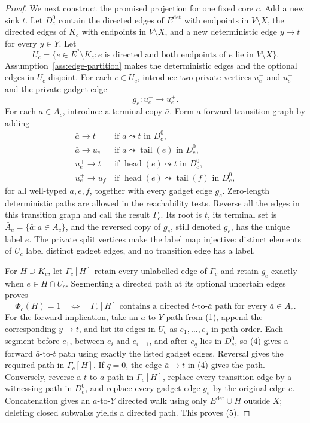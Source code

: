 \documentclass{article}
\begin{document}
\begin{proof}
We next construct the promised projection for one fixed core \(c\).  Add a new sink \(t\).  Let \(D_c^0\) contain the directed edges of \(E^{\mathrm{det}}\) with endpoints in \(V\setminus X\), the directed edges of \(K_c\) with endpoints in \(V\setminus X\), and a new deterministic edge \(y\to t\) for every \(y\in Y\).  Let
\[
 U_c=\{e\in E^{?}\setminus K_c:e\text{ is directed and both endpoints of }e
 \text{ lie in }V\setminus X\}.
\]
Assumption~\ref{ass:edge-partition} makes the deterministic edges and the optional edges in \(U_c\) disjoint.  For each \(e\in U_c\), introduce two private vertices \(u_e^-\) and \(u_e^+\) and the private gadget edge
\[
 g_e:u_e^-\longrightarrow u_e^+.
\]
For each \(a\in A_c\), introduce a terminal copy \(\bar a\).  Form a forward transition graph by adding
\[
 \begin{array}{ll}
 \bar a\to t &\text{if }a\leadsto t\text{ in }D_c^0,\\
 \bar a\to u_e^- &\text{if }a\leadsto \operatorname{tail}(e)\text{ in }D_c^0,\\
 u_e^+\to t &\text{if }\operatorname{head}(e)\leadsto t\text{ in }D_c^0,\\
 u_e^+\to u_f^- &\text{if }\operatorname{head}(e)\leadsto \operatorname{tail}(f)
                    \text{ in }D_c^0,
 \end{array}
 \tag{4}
\]
for all well-typed \(a,e,f\), together with every gadget edge \(g_e\).  Zero-length deterministic paths are allowed in the reachability tests.  Reverse all the edges in this transition graph and call the result \(\Gamma_c\).  Its root is \(t\), its terminal set is \(\bar A_c=\{\bar a:a\in A_c\}\), and the reversed copy of \(g_e\), still denoted \(g_e\), has the unique label \(e\).  The private split vertices make the label map injective: distinct elements of \(U_c\) label distinct gadget edges, and no transition edge has a label.

For \(H\supseteq K_c\), let \(\Gamma_c[H]\) retain every unlabelled edge of \(\Gamma_c\) and retain \(g_e\) exactly when \(e\in H\cap U_c\).  Segmenting a directed path at its optional uncertain edges proves
\[
 \Phi_c(H)=1
 \quad\Longleftrightarrow\quad
 \Gamma_c[H]\text{ contains a directed }t\text{-to-}\bar a\text{ path for every }
 \bar a\in\bar A_c.
 \tag{5}
\]
For the forward implication, take an \(a\)-to-\(Y\) path from (1), append the corresponding \(y\to t\), and list its edges in \(U_c\) as \(e_1,\ldots,e_q\) in path order.  Each segment before \(e_1\), between \(e_i\) and \(e_{i+1}\), and after \(e_q\) lies in \(D_c^0\), so (4) gives a forward \(\bar a\)-to-\(t\) path using exactly the listed gadget edges.  Reversal gives the required path in \(\Gamma_c[H]\).  If \(q=0\), the edge \(\bar a\to t\) in (4) gives the path.  Conversely, reverse a \(t\)-to-\(\bar a\) path in \(\Gamma_c[H]\), replace every transition edge by a witnessing path in \(D_c^0\), and replace every gadget edge \(g_e\) by the original edge \(e\).  Concatenation gives an \(a\)-to-\(Y\) directed walk using only \(E^{\mathrm{det}}\cup H\) outside \(X\); deleting closed subwalks yields a directed path.  This proves (5).


\end{proof}
\end{document}
